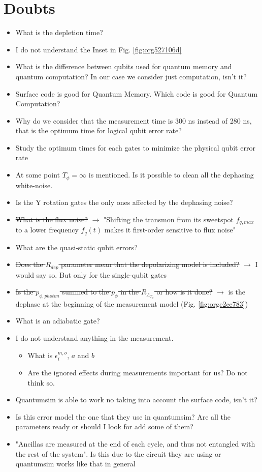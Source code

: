 \documentclass[11pt]{article}
\begin{document}
\section{Doubts}
\label{sec:org6f3d806}
\begin{itemize}
\item What is the depletion time?
\item I do not understand the Inset in Fig. \ref{fig:org527106d}
\item What is the difference between qubits used for quantum memory and quantum computation? In our case we consider just computation, isn't it?
\item Surface code is good for Quantum Memory. Which code is good for Quantum Computation?
\item Why do we consider that the measurement time is 300 ns instead of 280 ns, that is the optimum time for logical qubit error rate?
\item Study the optimum times for each gates to minimize the physical qubit error rate
\item At some point \(T_{\phi} = \infty\) is mentioned. Is it possible to clean all the dephasing white-noise.
\item Is the Y rotation gates the only ones affected by the dephasing noise?
\item \sout{What is the flux noise?} \(\to\) "Shifting the transmon from its sweetspot \(f_{q,max}\) to a lower frequency \(f_q (t)\) makes it first-order sensitive to flux noise"
\item What are the quasi-static qubit errors?
\item \sout{Does the \(R_{dep}\) parameter mean that the depolarizing model is included?} \(\to\) I would say so. But only for the single-qubit gates
\item \sout{Is the \(p_{\phi, photon}\) summed to the \(p_{\phi}\) in the \(R_{\Lambda_{T_{\phi}}}\) or how is it done?} \(\to\) is the dephase at the beginning of the measurement model (Fig. \ref{fig:orge2ce783})
\item What is an adiabatic gate?
\item I do not understand anything in the measurement.
\begin{itemize}
\item What is \(\epsilon_i^{m,o}\), \(a\) and \(b\)
\item Are the ignored effects during measurements important for us? Do not think so.
\end{itemize}
\item Quantumsim is able to work no taking into account the surface code, isn't it?
\item Is this error model the one that they use in quantumsim? Are all the parameters ready or should I look for add some of them?
\item "Ancillas are measured at the end of each cycle, and thus not entangled with the rest of the system". Is this due to the circuit they are using or quantumsim works like that in general
\end{itemize}
\end{document}
